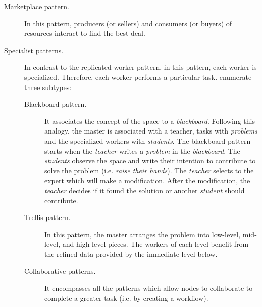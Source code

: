\begin{description}
\begin{enumerate*}[label=\itshape(\arabic*\upshape)]
			  \end{enumerate*}
  \item[Marketplace pattern.] In this pattern, producers (or sellers) and consumers (or buyers) of resources interact to find the best deal. %
  \item[Specialist patterns.] In contrast to the replicated-worker pattern, in this pattern, each worker is specialized.
                              Therefore, each worker performs a particular task.
                              \citeauthor{freeman_javaspaces_1999} enumerate three subtypes:
			      \begin{description}
				  \item[Blackboard pattern.]
					It associates the concept of the space to a \emph{blackboard}.
					Following this analogy, the master is associated with a teacher, tasks with \emph{problems} and the specialized workers with \emph{students}.
					The blackboard pattern starts when the \emph{teacher} writes a \emph{problem} in the \emph{blackboard}.
					The \emph{students} observe the space and write their intention to contribute to solve the problem (i.e. \emph{raise their hands}).
					The \emph{teacher} selects to the expert which will make a modification.
					After the modification, the \emph{teacher} decides if it found the solution or another \emph{student} should contribute.
				  \item [Trellis pattern.]
					In this pattern, the master arranges the problem into low-level, mid-level, and high-level pieces.
					The workers of each level benefit from the refined data provided by the immediate level below.
				  \item [Collaborative patterns.]
					It encompasses all the patterns which allow nodes to collaborate to complete a greater task (i.e. by creating a workflow).
			      \end{description}
\end{description}



